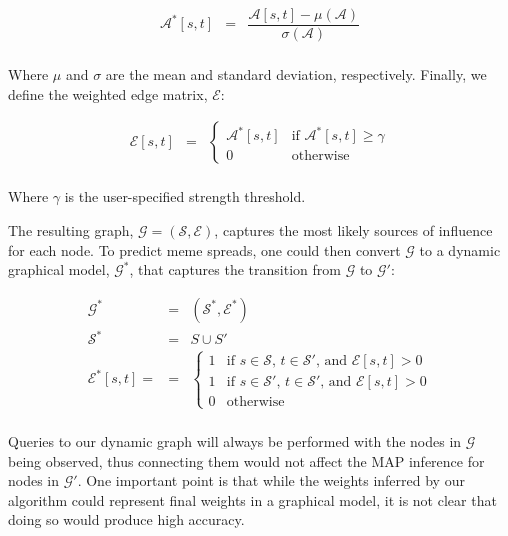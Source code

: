 \documentclass{article} %
\begin{document}
$$
\begin{array}{lll}
\mathcal{A}^*[s,t] &=& \dfrac{\mathcal{A}[s,t] - \mu(\mathcal{A})}{\sigma(\mathcal{A})}\\
\end{array}
$$

Where $\mu$ and $\sigma$ are the mean and standard deviation, respectively. Finally, we define the weighted edge matrix, $\mathcal{E}$:

$$
\begin{array}{lll}
\mathcal{E}[s,t] &=& \begin{cases}\mathcal{A}^*[s,t] & \text{if }\mathcal{A}^*[s,t] \geq \gamma \\0 &\text{otherwise}\end{cases}\\
\end{array}
$$

Where $\gamma$ is the user-specified strength threshold.

The resulting graph, $\mathcal{G} = (\mathcal{S},\mathcal{E})$, captures the most likely sources of influence for each node. To predict meme spreads, one could then convert $\mathcal{G}$ to a dynamic graphical model, $\mathcal{G}^*$, that captures the transition from $\mathcal{G}$ to $\mathcal{G'}$:

$$
\begin{array}{lll}
\mathcal{G}^* &=& (\mathcal{S}^*,\mathcal{E}^*)\\
\mathcal{S}^* &=& S \cup S'\\
\mathcal{E}^*[s,t] = &=& \begin{cases}1 & \text{if } s \in \mathcal{S}\text{, }t \in \mathcal{S'} \text{, and } \mathcal{E}[s,t] > 0\\
                                      1 & \text{if } s \in \mathcal{S'}\text{, }t \in \mathcal{S'} \text{, and } \mathcal{E}[s,t] > 0\\
                                      0 & \text{otherwise}\end{cases}\\
\end{array}
$$

Queries to our dynamic graph will always be performed with the nodes in $\mathcal{G}$ being observed, thus connecting them would not affect the MAP inference for nodes in $\mathcal{G'}$. One important point is that while the weights inferred by our algorithm could represent final weights in a graphical model, it is not clear that doing so would produce high accuracy.
\end{document}
